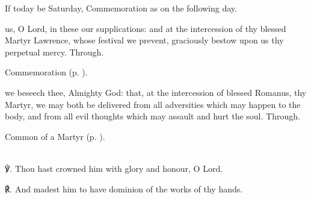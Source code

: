\begin{rubric}
	If today be Saturday, Commemoration  as on the following day.
\end{rubric}



{} us, O Lord, in these our supplications: and at the intercession of thy blessed Martyr Lawrence, whose festival we prevent, graciously bestow upon us thy perpetual mercy. Through.

\begin{rubric}
	Commemoration  (p. \pageref{RomanusCollect}).
\end{rubric}



\memorialCollect\label{RomanusCollect}
 we beseech thee, Almighty God: that, at the intercession of blessed Romanus, thy Martyr, we may both be delivered from all adversities which may happen to the body, and from all evil thoughts which may assault and hurt the soul. Through.


\clearpage
{}

\begin{rubric}
	Common of a Martyr (p. \pageref{CommonMartyr}).
\end{rubric}

\firstEvensong
{}\\

℣. Thou hast crowned him with glory and honour, O Lord.

℟. And madest him to have dominion of the works of thy hands.


\mattins
{}\\

